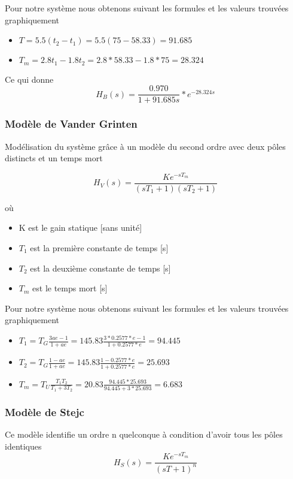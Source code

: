 Pour notre système nous obtenons suivant les formules et les valeurs trouvées graphiquement 
\begin{itemize}
\item $T = 5.5 (t_{2} - t_{1}) = 5.5 (75 - 58.33) = 91.685$
\item $T_{m} = 2.8 t_{1} - 1.8 t_{2} = 2.8*58.33 - 1.8*75 = 28.324$
\end{itemize}

Ce qui donne 
\begin{equation}
H_{B}(s) = \frac{0.970}{1 + 91.685s }*e^{-28.324s}
\end{equation}

\subsubsection{Modèle de Vander Grinten}
Modélisation du système grâce à un modèle du second ordre avec deux pôles distincts et un temps mort

\begin{equation}
H_{V}(s) = \frac{K e^{-s T_{m}}}{(sT_{1} + 1) (sT_{2} + 1)}
\end{equation}

où 
\begin{itemize}
\item K est le gain statique [sans unité]
\item $T_{1}$ est la première constante de temps [s]
\item $T_{2}$ est la deuxième constante de temps [s]
\item $T_{m}$ est le temps mort [s]
\end{itemize}

Pour notre système nous obtenons suivant les formules et les valeurs trouvées graphiquement 
\begin{itemize}
\item $T_{1} = T_{G} \frac{3ae - 1}{1 + ae} = 145.83 \frac{3*0.2577*e - 1}{1 + 0.2577*e} = 94.445$
\item $T_{2} = T_{G} \frac{1 - ae}{1 + ae} = 145.83 \frac{1 - 0.2577*e}{1 + 0.2577*e} = 25.693$
\item $T_{m} = T_{U} \frac{T_{1}T_{2}}{T_{1} + 3T_{2}} = 20.83 \frac{94.445*25.693}{94.445 + 3*25.693} = 6.683$
\end{itemize}

\subsubsection{Modèle de Stejc}
Ce modèle identifie un ordre n quelconque à condition d'avoir tous les pôles identiques
\begin{equation}
H_{S}(s) = \frac{K e^{-s T_{m}}}{(sT + 1)^{n}}
\end{equation}

